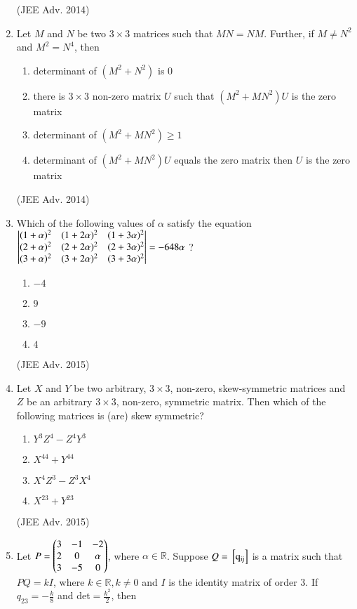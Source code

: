 \documentclass[journal]{IEEEtran}
\begin{document}
\begin{enumerate}
						\hfill (JEE Adv. 2014)
				\item
					Let $M$ and $N$ be two $3 \times 3$ matrices such that $MN=NM$. Further, if $M \neq N^2$ and $M^2 = N^4$, then
						\begin{enumerate}
							\item determinant of $(M^2 + N^2)$ is $0$
							\item there is $3 \times 3$ non-zero matrix $U$ such that $(M^2+MN^2)U$ is the zero matrix
							\item determinant of $(M^2 + MN^2) \geq 1$
							\item determinant of $(M^2 + MN^2)U$ equals the zero matrix then $U$ is the zero matrix
						\end{enumerate}
						\hfill (JEE Adv. 2014)
				\item
					Which of the following values of $\alpha$ satisfy the equation
						$\begin{vmatrix}
							(1 + \alpha)^2 & (1 + 2\alpha)^2 & (1+3\alpha)^2\\
							(2 + \alpha)^2 & (2 + 2\alpha)^2 & (2+3\alpha)^2\\
							(3 + \alpha)^2 & (3 + 2\alpha)^2 & (3+3\alpha)^2
						\end{vmatrix} = -648 \alpha $ ?
							\begin{enumerate}
								\item $-4$
								\item $9$
								\item $-9$
								\item $4$
							\end{enumerate}
							\hfill (JEE Adv. 2015)
				\item
					Let $X$ and $Y$ be two arbitrary, $3 \times 3$, non-zero, skew-symmetric matrices and $Z$ be an arbitrary $3 \times 3$, non-zero, symmetric matrix. Then which of the following matrices is (are) skew symmetric?
					\begin{enumerate}
						\item $Y^3Z^4 -Z^4Y^3$
						\item $X^{44} + Y^{44}$
						\item $X^4Z^3 -Z^3X^4$
						\item $X^{23} + Y^{23}$
					\end{enumerate}
					\hfill (JEE Adv. 2015)
				\item 
					Let $P = 
						\begin{pmatrix}		
							3 & -1 & -2\\
							2 & 0 & \alpha\\
							3 & -5 & 0
						\end{pmatrix}$,
					where $\alpha \in \mathbb{R}$. Suppose $Q= \mathrm{{}\left[q_{ij}\right]}$ is a matrix such that $PQ=kI$, where $k \in \mathbb{R}, k \neq 0$ and $I$ is the identity matrix of order $3$. If $q_{23} = -\frac{k}{8}$ and det$= \frac{k^2}{2}$, then

\end{enumerate}
\end{document}
